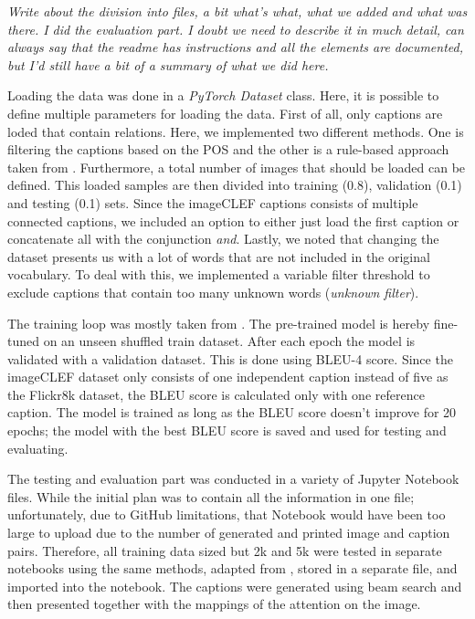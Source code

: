 \documentclass[11pt]{article}
\begin{document}
\textit{Write about the division into files, a bit what's what, what we added and what was there. I did the evaluation part. I doubt we need to describe it in much detail, can always say that the readme has instructions and all the elements are documented, but I'd still have a bit of a summary of what we did here.}

Loading the data was done in a \emph{PyTorch Dataset} class. Here, it is possible to define multiple parameters for loading the data. First of all, only captions are loded that contain relations. Here, we implemented two different methods. One is filtering the captions based on the POS and the other is a rule-based approach taken from \cite{Ghanimifard2018}. Furthermore, a total number of images that should be loaded can be defined. This loaded samples are then divided into training (0.8), validation (0.1) and testing (0.1) sets. Since the imageCLEF captions consists of multiple connected captions, we included an option to either just load the first caption or concatenate all with the conjunction \emph{and}. Lastly, we noted that changing the dataset presents us with a lot of words that are not included in the original vocabulary. To deal with this, we implemented a variable filter threshold to exclude captions that contain too many unknown words (\emph{unknown filter}).

The training loop was mostly taken from \cite{ilinykh}. The pre-trained model is hereby fine-tuned on an unseen shuffled train dataset. After each epoch the model is validated with a validation dataset. This is done using BLEU-4 score. Since the imageCLEF dataset only consists of one independent caption instead of five as the Flickr8k dataset, the BLEU score is calculated only with one reference caption. The model is trained as long as the BLEU score doesn't improve for 20 epochs; the model with the best BLEU score is saved and used for testing and evaluating.

The testing and evaluation part was conducted in a variety of Jupyter Notebook files. While the initial plan was to contain all the information in one file; unfortunately, due to GitHub limitations, that Notebook would have been too large to upload due to the number of generated and printed image and caption pairs. Therefore, all training data sized but 2k and 5k were tested in separate notebooks using the same methods, adapted from \cite{ilinykh}, stored in a separate file, and imported into the notebook. The captions were generated using beam search and then presented together with the mappings of the attention on the image.
\end{document}
